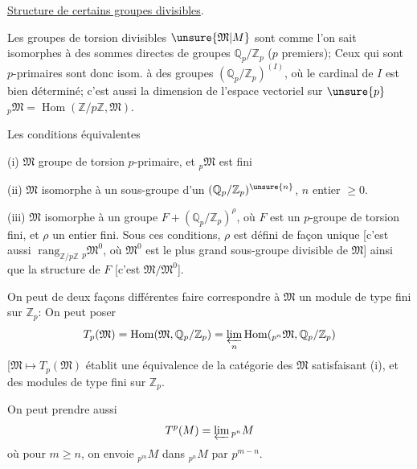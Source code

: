 \uline{Structure de certains groupes divisibles}.

 Les groupes de torsion divisibles $\unsure{\mathfrak M|M}$ sont comme l'on sait isomorphes à des sommes directes de groupes $\mathbb Q_p/\mathbb Z_p$ ($p$ premiers); Ceux qui sont $p$-primaires sont donc isom. à des  groupes $(\mathbb Q_p/\mathbb Z_p)^{(I)}$, où le cardinal de $I$ est bien déterminé; c'est aussi la dimension de l'espace vectoriel sur $\unsure{p}$ ${}_p\mathfrak M=\operatorname{Hom}(\mathbb Z/p\mathbb Z,\mathfrak M)$.

Les conditions équivalentes

(i) $\mathfrak M$ groupe de torsion $p$-primaire, et ${}_p\mathfrak M$ est fini

(ii) $\mathfrak M$ isomorphe à un sous-groupe d'un $(\mathbb Q_p/\mathbb Z_p)^{\unsure{n}}$,  $n$ entier $\geq0$.

(iii) $\mathfrak M$ isomorphe à un groupe $F+(\mathbb Q_p/\mathbb Z_p)^{\rho}$, où $F$ est un $p$-groupe de torsion fini, et $\rho$ un entier fini.
Sous ces conditions, $\rho$ est défini de façon unique [c'est aussi $\operatorname{rang}_{\mathbb Z/p\mathbb Z}{}_p\mathfrak M^0$, où $\mathfrak M^0$ est le plus grand sous-groupe divisible de $\mathfrak M$] ainsi que la structure de $F$ [c'est $\mathfrak M/\mathfrak M^0$].

On peut de deux façons différentes faire correspondre à $\mathfrak M$ un module de type fini sur $\mathbb Z_p$:
On peut poser
\[
T_p(\mathfrak M)=\operatorname{Hom}(\mathfrak M,\mathbb Q_p/\mathbb Z_p)=\varprojlim_n\operatorname{Hom}({}_{p^n}\mathfrak M,\mathbb Q_p/\mathbb Z_p)
\]
[$\mathfrak M\mapsto T_p(\mathfrak M)$ établit une équivalence de la catégorie des $\mathfrak M$ satisfaisant (i), et des modules de type fini sur $\mathbb Z_p$.

On peut prendre aussi
\[
T^p(M)=\varprojlim {}_{p^n}M
\]
où pour $m\geq n$, on envoie ${}_{p^m}M$ dans ${}_{p^n}M$ par $p^{m-n}$.
